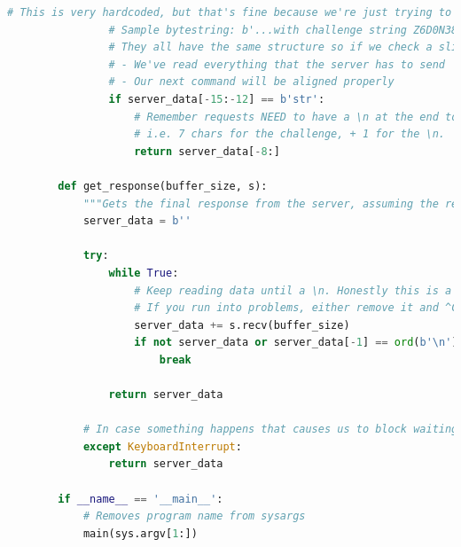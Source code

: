 \documentclass[11pt]{article}
\begin{document}
\begin{lstlisting}[gobble=8,label={lst:full-code},language=Python,basicstyle={\scriptsize\ttfamily}]
                # This is very hardcoded, but that's fine because we're just trying to break THIS protocol.
                # Sample bytestring: b'...with challenge string Z6D0N38\n' (remember, the `\n` is one character!)
                # They all have the same structure so if we check a slice of the output and get "str", we know that:
                # - We've read everything that the server has to send
                # - Our next command will be aligned properly
                if server_data[-15:-12] == b'str':
                    # Remember requests NEED to have a \n at the end to be considered "submitted", so we include that.
                    # i.e. 7 chars for the challenge, + 1 for the \n.
                    return server_data[-8:]

        def get_response(buffer_size, s):
            """Gets the final response from the server, assuming the rest of the protocol executed correctly."""
            server_data = b''

            try:
                while True:
                    # Keep reading data until a \n. Honestly this is a pretty flaky solution because there are 7 \n's in a successful final string, but the chances of a buffered read with a 4096 byte buffer ending on one of those intermediate ones is quite low, at least experimentally.
                    # If you run into problems, either remove it and ^C it yourself, OR use something like socket.select(). This worked for me, though.
                    server_data += s.recv(buffer_size)
                    if not server_data or server_data[-1] == ord(b'\n'):
                        break

                return server_data

            # In case something happens that causes us to block waiting for more data (can sometimes happen), a ^C will print what we captured already
            except KeyboardInterrupt:
                return server_data

        if __name__ == '__main__':
            # Removes program name from sysargs
            main(sys.argv[1:])
    \end{lstlisting}
\end{document}
